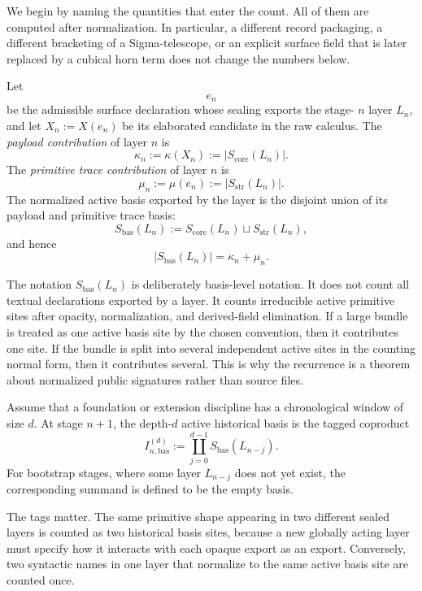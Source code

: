We begin by naming the quantities that enter the count.  All of them are computed after
normalization.  In particular, a different record packaging, a different bracketing of a
Sigma-telescope, or an explicit surface field that is later replaced by a cubical horn term
does not change the numbers below.

\begin{definition}
\label{def:layerwise-payload-trace}
Let
\[
  e_n
\]
be the admissible surface declaration whose sealing exports the stage-
\(n\) layer \(L_n\), and let \(X_n := X(e_n)\) be its elaborated candidate in the raw calculus.
The \emph{payload contribution} of layer \(n\) is
\[
  \kappa_n := \kappa(X_n) := |S_{\mathrm{core}}(L_n)|.
\]
The \emph{primitive trace contribution} of layer \(n\) is
\[
  \mu_n := \mu(e_n) := |S_{\mathrm{str}}(L_n)|.
\]
The normalized active basis exported by the layer is the disjoint union of its payload and
primitive trace basis:
\[
  S_{\mathrm{bas}}(L_n)
  := S_{\mathrm{core}}(L_n) \sqcup S_{\mathrm{str}}(L_n),
\]
and hence
\[
  |S_{\mathrm{bas}}(L_n)| = \kappa_n + \mu_n.
\]
\end{definition}

The notation \(S_{\mathrm{bas}}(L_n)\) is deliberately basis-level notation.  It does not count
all textual declarations exported by a layer.  It counts irreducible active primitive sites
after opacity, normalization, and derived-field elimination.  If a large bundle is treated as
one active basis site by the chosen convention, then it contributes one site.  If the bundle is
split into several independent active sites in the counting normal form, then it contributes
several.  This is why the recurrence is a theorem about normalized public signatures rather
than source files.

\begin{definition}
\label{def:historical-basis-window}
Assume that a foundation or extension discipline has a chronological window of size \(d\).
At stage \(n+1\), the depth-\(d\) active historical basis is the tagged coproduct
\[
  I^{(d)}_{n,\mathrm{bas}}
  :=
  \coprod_{j=0}^{d-1} S_{\mathrm{bas}}(L_{n-j}).
\]
For bootstrap stages, where some layer \(L_{n-j}\) does not yet exist, the corresponding
summand is defined to be the empty basis.
\end{definition}

The tags matter.  The same primitive shape appearing in two different sealed layers is counted
as two historical basis sites, because a new globally acting layer must specify how it
interacts with each opaque export as an export.  Conversely, two syntactic names in one layer
that normalize to the same active basis site are counted once.

